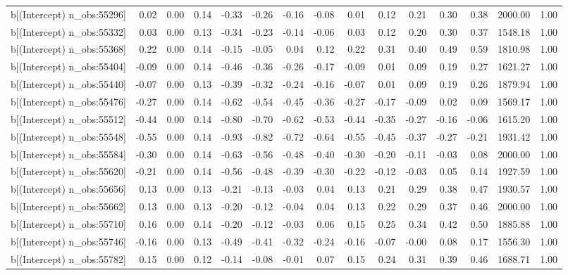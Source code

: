 \begin{table}[ht]
\begin{tabular}{rrrrrrrrrrrrrrr}
  b[(Intercept) n\_obs:55296] & 0.02 & 0.00 & 0.14 & -0.33 & -0.26 & -0.16 & -0.08 & 0.01 & 0.12 & 0.21 & 0.30 & 0.38 & 2000.00 & 1.00 \\ 
  b[(Intercept) n\_obs:55332] & 0.03 & 0.00 & 0.13 & -0.34 & -0.23 & -0.14 & -0.06 & 0.03 & 0.12 & 0.20 & 0.30 & 0.37 & 1548.18 & 1.00 \\ 
  b[(Intercept) n\_obs:55368] & 0.22 & 0.00 & 0.14 & -0.15 & -0.05 & 0.04 & 0.12 & 0.22 & 0.31 & 0.40 & 0.49 & 0.59 & 1810.98 & 1.00 \\ 
  b[(Intercept) n\_obs:55404] & -0.09 & 0.00 & 0.14 & -0.46 & -0.36 & -0.26 & -0.17 & -0.09 & 0.01 & 0.09 & 0.19 & 0.27 & 1621.27 & 1.00 \\ 
  b[(Intercept) n\_obs:55440] & -0.07 & 0.00 & 0.13 & -0.39 & -0.32 & -0.24 & -0.16 & -0.07 & 0.01 & 0.09 & 0.19 & 0.26 & 1879.94 & 1.00 \\ 
  b[(Intercept) n\_obs:55476] & -0.27 & 0.00 & 0.14 & -0.62 & -0.54 & -0.45 & -0.36 & -0.27 & -0.17 & -0.09 & 0.02 & 0.09 & 1569.17 & 1.00 \\ 
  b[(Intercept) n\_obs:55512] & -0.44 & 0.00 & 0.14 & -0.80 & -0.70 & -0.62 & -0.53 & -0.44 & -0.35 & -0.27 & -0.16 & -0.06 & 1615.20 & 1.00 \\ 
  b[(Intercept) n\_obs:55548] & -0.55 & 0.00 & 0.14 & -0.93 & -0.82 & -0.72 & -0.64 & -0.55 & -0.45 & -0.37 & -0.27 & -0.21 & 1931.42 & 1.00 \\ 
  b[(Intercept) n\_obs:55584] & -0.30 & 0.00 & 0.14 & -0.63 & -0.56 & -0.48 & -0.40 & -0.30 & -0.20 & -0.11 & -0.03 & 0.08 & 2000.00 & 1.00 \\ 
  b[(Intercept) n\_obs:55620] & -0.21 & 0.00 & 0.14 & -0.56 & -0.48 & -0.39 & -0.30 & -0.22 & -0.12 & -0.03 & 0.05 & 0.14 & 1927.59 & 1.00 \\ 
  b[(Intercept) n\_obs:55656] & 0.13 & 0.00 & 0.13 & -0.21 & -0.13 & -0.03 & 0.04 & 0.13 & 0.21 & 0.29 & 0.38 & 0.47 & 1930.57 & 1.00 \\ 
  b[(Intercept) n\_obs:55662] & 0.13 & 0.00 & 0.13 & -0.20 & -0.12 & -0.04 & 0.04 & 0.13 & 0.22 & 0.29 & 0.37 & 0.46 & 2000.00 & 1.00 \\ 
  b[(Intercept) n\_obs:55710] & 0.16 & 0.00 & 0.14 & -0.20 & -0.12 & -0.03 & 0.06 & 0.15 & 0.25 & 0.34 & 0.42 & 0.50 & 1885.88 & 1.00 \\ 
  b[(Intercept) n\_obs:55746] & -0.16 & 0.00 & 0.13 & -0.49 & -0.41 & -0.32 & -0.24 & -0.16 & -0.07 & -0.00 & 0.08 & 0.17 & 1556.30 & 1.00 \\ 
  b[(Intercept) n\_obs:55782] & 0.15 & 0.00 & 0.12 & -0.14 & -0.08 & -0.01 & 0.07 & 0.15 & 0.24 & 0.31 & 0.39 & 0.46 & 1688.71 & 1.00 \\ 

\end{tabular}
\end{table}
